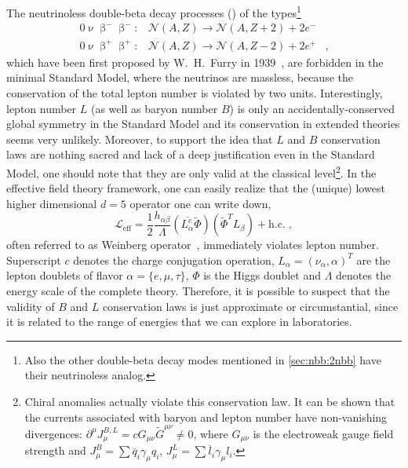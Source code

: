 The neutrinoless double-beta decay processes (\onbb) of the types\footnote{%
  Also the other double-beta decay modes mentioned in \cref{sec:nbb:2nbb} have their
  neutrinoless analog.
}
\[
  \begin{array}{lrl}
    0\upnu\upbeta^-\upbeta^-: &
      \mathcal{N}(A,Z) \longrightarrow \mathcal{N}(A,Z+2)+2e^- & \\
    0\upnu\upbeta^+\upbeta^+: &
      \mathcal{N}(A,Z) \longrightarrow \mathcal{N}(A,Z-2)+2e^+ &,
  \end{array}
\]
which have been first proposed by W.~H.~Furry in 1939~\cite{Furry1939}, are forbidden in
the minimal Standard Model, where the neutrinos are massless, because the conservation of
the total lepton number is violated by two units.  Interestingly, lepton number $L$ (as
well as baryon number $B$) is only an accidentally-conserved global symmetry in the
Standard Model and its conservation in extended theories seems very unlikely. Moreover, to
support the idea that $L$ and $B$ conservation laws are nothing sacred and lack of a deep
justification even in the Standard Model, one should note that they are only valid at the
classical level\footnote{%
  Chiral anomalies actually violate this conservation law. It can be shown that the
  currents associated with baryon and lepton number have non-vanishing divergences:
  $\partial^\mu J_\mu^{B,L} = c G_{\mu\nu} \widetilde{G}^{\mu\nu} \neq 0$, where
  $G_{\mu\nu}$ is the electroweak gauge field strength and $J_\mu^B = \sum \overline{q}_i
  \gamma_\mu q_i$, $J_\mu^L = \sum \overline{l}_i \gamma_\mu l_i$.
}. In the effective field theory framework, one can easily realize that the (unique)
lowest higher dimensional $d=5$ operator one can write down,
\[
  \mathcal{L}_\text{eff} = \frac{1}{2} \frac{h_{\alpha\beta}}{\Lambda}
                           (\overline{L_\alpha^c}\widetilde{\Phi})
                           (\widetilde{\Phi}^T L_\beta) + \text{h.c.} \;,
\]
often referred to as Weinberg operator~\cite{Weinberg1979}, immediately violates lepton
number. Superscript $c$ denotes the charge conjugation operation, $L_\alpha =
(\nu_\alpha, \alpha)^T$ are the lepton doublets of flavor $\alpha = \{e, \mu, \tau\}$, $\Phi$
is the Higgs doublet and $\Lambda$ denotes the energy scale of the complete theory.
Therefore, it is possible to suspect that the validity of $B$ and $L$ conservation laws is
just approximate or circumstantial, since it is related to the range of energies that we
can explore in laboratories.

